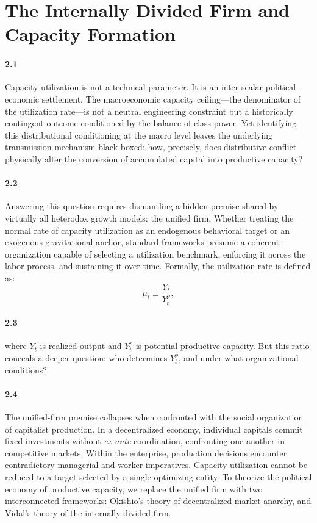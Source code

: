 \section{The Internally Divided Firm and Capacity Formation}

\paragraph{2.1} Capacity utilization is not a technical parameter. It is an
inter-scalar political-economic settlement. The macroeconomic
capacity ceiling---the denominator of the utilization rate---is
not a neutral engineering constraint but a historically contingent
outcome conditioned by the balance of class power. Yet identifying
this distributional conditioning at the macro level leaves the
underlying transmission mechanism black-boxed: how, precisely,
does distributive conflict physically alter the conversion of
accumulated capital into productive capacity?

\paragraph{2.2} Answering this question requires dismantling a hidden premise
shared by virtually all heterodox growth models: the unified
firm. Whether treating the normal rate of capacity utilization
as an endogenous behavioral target or an exogenous gravitational
anchor, standard frameworks presume a coherent organization
capable of selecting a utilization benchmark, enforcing it across
the labor process, and sustaining it over time. Formally, the
utilization rate is defined as:
%
\begin{equation}\label{eq:utilization}
	\mu_t \equiv \frac{Y_t}{Y^p_t},
\end{equation}
%
\paragraph{2.3} \noindent where $Y_t$ is realized output and $Y^p_t$ is potential
productive capacity. But this ratio conceals a deeper question:
who determines $Y^p_t$, and under what organizational conditions?

\paragraph{2.4} The unified-firm premise collapses when confronted with the
social organization of capitalist production. In a decentralized
economy, individual capitals commit fixed investments without
\textit{ex-ante} coordination, confronting one another in
competitive markets. Within the enterprise, production decisions
encounter contradictory managerial and worker imperatives.
Capacity utilization cannot be reduced to a target selected by
a single optimizing entity. To theorize the political economy
of productive capacity, we replace the unified firm with two
interconnected frameworks: Okishio's theory of decentralized
market anarchy, and Vidal's theory of the internally divided
firm.

